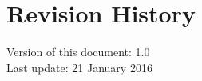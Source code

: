 \section{Revision History}
\label{sec:revision-history}

Version of this document: 1.0\\
Last update: 21 January 2016